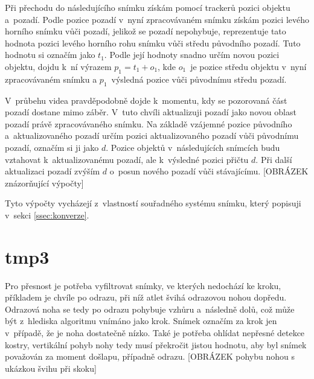 Při přechodu do následujícího snímku získám pomocí trackerů pozici objektu a~pozadí. Podle pozice pozadí v~nyní zpracovávaném snímku získám pozici levého horního snímku vůči pozadí, jelikož se pozadí nepohybuje, reprezentuje tato hodnota pozici levého horního rohu snímku vůči středu původního pozadí. Tuto hodnotu si označím jako $t_1$. Podle její hodnoty snadno určím novou pozici objektu, dojdu k~ní výrazem $p_1=t_1+o_1$, kde $o_1$~je pozice středu objektu v~nyní zpracovávaném snímku a $p_1$~výsledná pozice vůči původnímu středu pozadí.

V~průbehu videa pravděpodobně dojde k~momentu, kdy se pozorovaná část pozadí dostane mimo záběr. V~tuto chvíli aktualizuji pozadí jako novou oblast pozadí právě zpracovávaného snímku. Na základě vzájemné pozice původního a~aktualizovaného pozadí určím pozici aktualizovaného pozadí vůči původnímu pozadí, označím si ji jako $d$. Pozice objektů v~následujících snímcích budu vztahovat k~aktualizovanému pozadí, ale k~výsledné pozici přičtu $d$. Při další aktualizaci pozadí zvýším $d$ o~posun nového pozadí vůči stávajícímu. [OBRÁZEK znázorňující výpočty]

Tyto výpočty vycházejí z~vlastností souřadného systému snímku, který popisuji v~sekci \ref{ssec:konverze}.

\section{tmp3}

Pro přesnost je potřeba vyfiltrovat snímky, ve kterých nedochází ke kroku, příkladem je chvíle po odrazu, při níž atlet švihá odrazovou nohou dopředu. Odrazová noha se tedy po odrazu pohybuje vzhůru a~následně dolů, což může být z~hlediska algoritmu vnímáno jako krok. Snímek označím za krok jen v~případě, že je noha dostatečně nízko. Také je potřeba ohlídat nepřesné detekce kostry, vertikální pohyb nohy tedy musí překročit jistou hodnotu, aby byl snímek považován za moment došlapu, případně odrazu. [OBRÁZEK pohybu nohou s ukázkou švihu při skoku]












